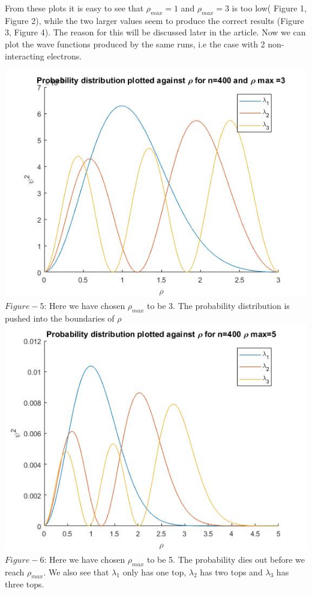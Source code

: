 \documentclass[10pt,a4paper]{article}
\begin{document}
\noindent From these plots it is easy to see that ${\rho}_{max}=1$ and ${\rho}_{max}=3$ is too low( Figure 1, Figure 2), while the two larger values seem to produce the correct results (Figure 3, Figure 4). The reason for this will be discussed later in the article. Now we can plot the wave functions produced by the same runs, i.e the case with 2 non-interacting electrons. 
\newpage
\begin{center}
\includegraphics[scale=0.55]{eig400rho3.jpg}
$Figure-5$: Here we have chosen ${\rho}_{max}$ to be 3. The probability distribution is pushed into the boundaries of $\rho$
\includegraphics[scale=0.55]{eig400rho5.jpg}
$Figure-6$: Here we have chosen ${\rho}_{max}$ to be 5. The probability dies out before we reach ${\rho}_{max}$. We also see that $\lambda_1$ only has one top, $\lambda_2$ has two tops and $\lambda_3$ has three tops. 


\end{center}
\end{document}
